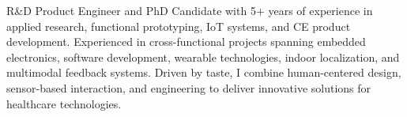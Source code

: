 






{R\&D Product Engineer and PhD Candidate with 5+ years of experience in applied research, functional prototyping, IoT systems, and CE product development. Experienced in cross-functional projects spanning embedded electronics, software development, wearable technologies, indoor localization, and multimodal feedback systems. Driven by taste, I combine human-centered design, sensor-based interaction, and engineering to deliver innovative solutions for healthcare technologies.}




